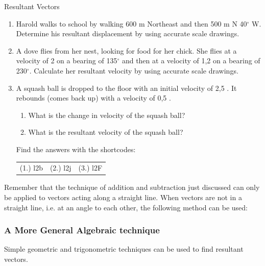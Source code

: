 \begin{exercises}{Resultant Vectors}{
\begin{enumerate}[noitemsep, label=\textbf{\arabic*}.]
\item Harold walks to school by walking 600 m Northeast and then 500 m N 40$^\circ$ W. Determine his resultant displacement by using accurate scale drawings.
\item A dove flies from her nest, looking for food for her chick. She flies at a velocity of 2 \ms on a bearing of 135$^\circ$ and then at a velocity of 1,2 \ms on a bearing of 230$^\circ$. Calculate her resultant velocity by using accurate scale drawings.
\item A squash ball is dropped to the floor with an initial velocity of 2,5 \ms. It rebounds (comes back up) with a velocity of 0,5 \ms. \begin{enumerate}
	\item What is the change in velocity of the squash ball?
	\item What is the resultant velocity of the squash ball?
	\end{enumerate}
  \label{59e414b70efc194a27a122db47d06ce6**end}
\par {} Find the answers with the shortcodes:
 \par \begin{tabular}[h]{ccc}
 (1.) l2b  &  (2.) l2j  &  (3.) l2F  \end{tabular}
\end{enumerate}
}
\end{exercises}

Remember that the technique of addition and subtraction just discussed can only be applied to vectors acting along a straight line. When vectors are not in a straight line, i.e. at an angle to each other, the following method can be used:

\subsubsection*{A More General Algebraic technique}
Simple geometric and trigonometric techniques can be used to find resultant vectors.

